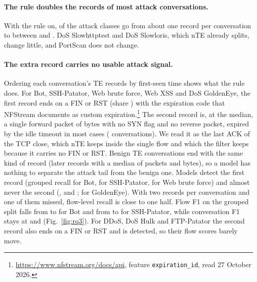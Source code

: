 \documentclass[pdflatex,sn-mathphys-num]{sn-jnl}
\theoremstyle{thmstyleone}%
\theoremstyle{thmstylethree}%
\begin{document}


\paragraph{The rule doubles the records of most attack conversations.} With the rule on, \RQthreeDoubled{} of the \RQthreeClasses{} attack classes go from about one record per conversation to between \RQthreeDoubledMin{} and \RQthreeDoubledMax{}. DoS Slowhttptest and DoS Slowloris, which nTE already splits, change little, and PortScan does not change.

\paragraph{The extra record carries no usable attack signal.} Ordering each conversation's TE records by first-seen time shows what the rule does. For Bot, SSH-Patator, Web brute force, Web XSS and DoS GoldenEye, the first record ends on a FIN or RST (share \RQthreeFirstFin{}) with the expiration code that NFStream documents as custom expiration.\footnote{\url{https://www.nfstream.org/docs/api}, feature \texttt{expiration\_id}, read 27 October 2026.} The second record is, at the median, a single forward packet of \RQthreeTailBytes{} bytes with no SYN flag and no reverse packet, expired by the idle timeout in most cases (\RQthreeSecondIdle{} conversations). We read it as the last ACK of the TCP close, which nTE keeps inside the single flow and which the filter keeps because it carries no FIN or RST. Benign TE conversations end with the same kind of record (later records with a median of \RQthreeBenignTailPackets{} packets and \RQthreeBenignTailBytes{} bytes), so a model has nothing to separate the attack tail from the benign one. Models detect the first record (grouped recall \RQthreeRecallFirstBot{} for Bot, \RQthreeRecallFirstSsh{} for SSH-Patator, \RQthreeRecallFirstWebBf{} for Web brute force) and almost never the second (\RQthreeRecallSecondBot{}, \RQthreeRecallSecondSsh{} and \RQthreeRecallSecondWebBf{}; \RQthreeRecallSecondGolden{} for GoldenEye). With two records per conversation and one of them missed, flow-level recall is close to one half. Flow F1 on the grouped split falls from \RQthreeFlowBotNte{} to \RQthreeFlowBotTe{} for Bot and from \RQthreeFlowSshNte{} to \RQthreeFlowSshTe{} for SSH-Patator, while conversation F1 stays at \RQthreeConvBotTe{} and \RQthreeConvSshTe{} (Fig.~\ref{fig:rq3}). For DDoS, DoS Hulk and FTP-Patator the second record also ends on a FIN or RST and is detected, so their flow scores barely move.
\end{document}
